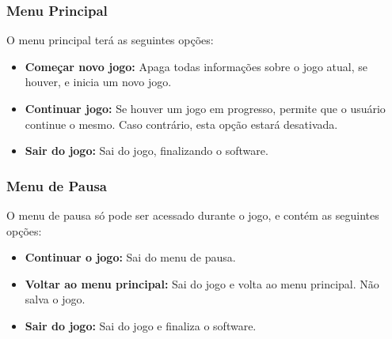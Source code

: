 \subsubsection{Menu Principal}

O menu principal terá as seguintes opções:
\begin{itemize}
 \item {\bf Começar novo jogo:} Apaga todas informações sobre o jogo atual,
se houver, e inicia um novo jogo.
 \item {\bf Continuar jogo:} Se houver um jogo em progresso, permite que
o usuário continue o mesmo. Caso contrário, esta opção estará desativada.
 \item {\bf Sair do jogo:} Sai do jogo, finalizando o software.
\end{itemize}

\subsubsection{Menu de Pausa}
O menu de pausa só pode ser acessado durante o jogo, e contém as seguintes
opções:
\begin{itemize}
 \item {\bf Continuar o jogo:} Sai do menu de pausa.
 \item {\bf Voltar ao menu principal:} Sai do jogo e volta ao menu 
principal. Não salva o jogo.
 \item {\bf Sair do jogo:} Sai do jogo e finaliza o software.
\end{itemize}


